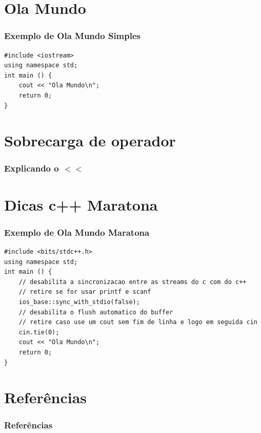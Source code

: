 \documentclass[12pt]{beamer}
\begin{document}
\section{Ola Mundo}\label{Ola Mundo}
\begin{frame}[t,fragile]{\insertsectionhead}
    \frametitle{Exemplo de Ola Mundo Simples}
    \begin{lstlisting}
#include <iostream>
using namespace std;
int main () {
    cout << "Ola Mundo\n";
    return 0;
}
    \end{lstlisting}
\end{frame}

\section{Sobrecarga de operador}\label{Sobrecarga de operador}
\begin{frame}
    \frametitle{Explicando o $<<$}
\end{frame}

\section{Dicas c++ Maratona}\label{Dicas c++ Maratona}
\begin{frame}[t,fragile]{\insertsectionhead}
    \frametitle{Exemplo de Ola Mundo Maratona}
    \begin{center}
    \begin{lstlisting}
#include <bits/stdc++.h>
using namespace std;
int main () {
    // desabilita a sincronizacao entre as streams do c com do c++
    // retire se for usar printf e scanf
    ios_base::sync_with_stdio(false);
    // desabilita o flush automatico do buffer
    // retire caso use um cout sem fim de linha e logo em seguida cin
    cin.tie(0);
    cout << "Ola Mundo\n";
    return 0;
}
    \end{lstlisting}
    \end{center}
\end{frame}


\section{Referências}\label{Referências}
\begin{frame}[allowframebreaks]
    \frametitle{Referências}
    
\end{frame}
\end{document}
